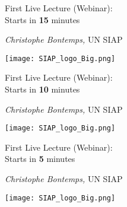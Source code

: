 \documentclass[xcolor=x11names,compress, aspectratio=169]{beamer}
\renewcommand{\(}{\begin{columns}}
\renewcommand{\)}{\end{columns}}
\newcommand{\<}[1]{\begin{column}{#1}}
\renewcommand{\>}{\end{column}}
\begin{document}
\begin{frame}
\Large{ \color{siap}{Machine Learning for Official Statistics and SDGs}}
\vspace{0.5cm}

{\huge\textcolor{brique}{First Live Lecture (Webinar): \\
\vspace{0.2cm}
Starts in \textbf{15} minutes\\
}}

\vspace{0.5cm}
\begin{center}
\textcolor{siap}{\textit{Christophe Bontemps,} UN  SIAP\\ }
\vspace{1cm}

\texttt{[image: SIAP\_logo\_Big.png]}
\end{center}
\end{frame}

\begin{frame}
\Large{ \color{siap}{Machine Learning for Official Statistics and SDGs}}
\vspace{0.5cm}

{\huge\textcolor{brique}{First Live Lecture (Webinar): \\
\vspace{0.2cm}
Starts in \textbf{10} minutes\\
}}

\vspace{0.5cm}
\begin{center}
\textcolor{siap}{\textit{Christophe Bontemps,} UN  SIAP\\ }
\vspace{1cm}

\texttt{[image: SIAP\_logo\_Big.png]}
\end{center}
\end{frame}

\begin{frame}
\Large{ \color{siap}{Machine Learning for Official Statistics and SDGs}}
\vspace{0.5cm}

{\huge\textcolor{brique}{First Live Lecture (Webinar): \\
\vspace{0.2cm}
Starts in \textbf{5} minutes\\
}}

\vspace{0.5cm}
\begin{center}
\textcolor{siap}{\textit{Christophe Bontemps,} UN  SIAP\\ }
\vspace{1cm}

\texttt{[image: SIAP\_logo\_Big.png]}
\end{center}
\end{frame}
\end{document}
